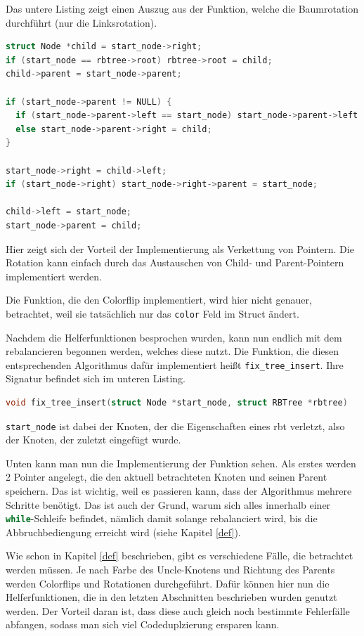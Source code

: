 \documentclass[11pt]{article}
\newcommand{\lstin}[1]{\lstinline[language=C]{#1}}
\begin{document}
Das untere Listing zeigt einen Auszug aus der Funktion, welche die Baumrotation durchführt (nur die Linksrotation).

\begin{lstlisting}[language=C]
struct Node *child = start_node->right;
if (start_node == rbtree->root) rbtree->root = child;
child->parent = start_node->parent;

if (start_node->parent != NULL) {
  if (start_node->parent->left == start_node) start_node->parent->left = child;
  else start_node->parent->right = child;
}

start_node->right = child->left;
if (start_node->right) start_node->right->parent = start_node;

child->left = start_node;
start_node->parent = child;
\end{lstlisting}

Hier zeigt sich der Vorteil der Implementierung als Verkettung von Pointern. Die Rotation kann einfach durch das Austauschen von Child- und Parent-Pointern implementiert werden.

Die Funktion, die den Colorflip implementiert, wird hier nicht genauer, betrachtet, weil sie tatsächlich nur das \lstin{color} Feld im Struct ändert.

Nachdem die Helferfunktionen besprochen wurden, kann nun endlich mit dem rebalancieren begonnen werden, welches diese nutzt.
Die Funktion, die diesen entsprechenden Algorithmus dafür implementiert heißt \lstin{fix_tree_insert}. Ihre Signatur befindet sich im unteren Listing.

\begin{lstlisting}[language=C]
void fix_tree_insert(struct Node *start_node, struct RBTree *rbtree)
\end{lstlisting}

\lstin{start_node} ist dabei der Knoten, der die Eigenschaften eines \gls{rbt} verletzt, also der Knoten, der zuletzt eingefügt wurde.

Unten kann man nun die Implementierung der Funktion sehen.
Als erstes werden 2 Pointer angelegt, die den aktuell betrachteten Knoten und seinen Parent speichern.
Das ist wichtig, weil es passieren kann, dass der Algorithmus mehrere Schritte benötigt.
Das ist auch der Grund, warum sich alles innerhalb einer \lstin{while}-Schleife befindet, nämlich damit solange rebalanciert wird,
bis die Abbruchbediengung erreicht wird (siehe Kapitel \ref{def}).

Wie schon in Kapitel \ref{def} beschrieben, gibt es verschiedene Fälle, die betrachtet werden müssen.
Je nach Farbe des Uncle-Knotens und Richtung des Parents werden Colorflips und Rotationen durchgeführt.
Dafür können hier nun die Helferfunktionen, die in den letzten Abschnitten beschrieben wurden genutzt werden.
Der Vorteil daran ist, dass diese auch gleich noch bestimmte Fehlerfälle abfangen, sodass man sich viel Codeduplzierung ersparen kann.
\end{document}
